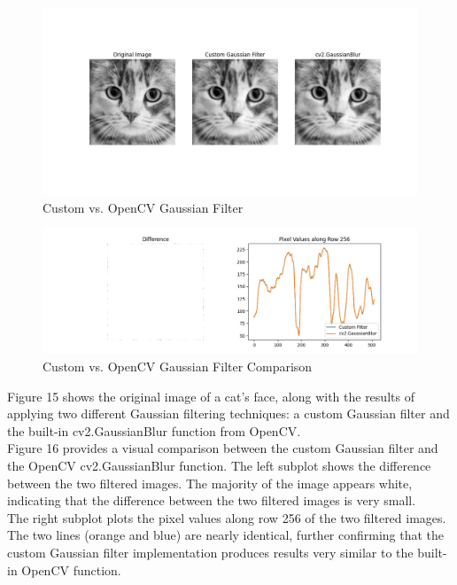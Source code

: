 \documentclass[12pt]{article}
\begin{document}
\begin{figure}
  \centering
  \includegraphics[width=1.0\textwidth]{custom_vs_opencv_gaussian_filter.png}
  \caption{Custom vs. OpenCV Gaussian Filter}
  \label{fig:example}
\end{figure}

\begin{figure}
  \centering
  \includegraphics[width=1.0\textwidth]{custom_vs_opencv_gaussian_filter_comparison.png}
  \caption{Custom vs. OpenCV Gaussian Filter Comparison}
  \label{fig:example}
\end{figure}

Figure 15 shows the original image of a cat's face, along with the results of applying two different Gaussian filtering techniques: a custom Gaussian filter and the built-in cv2.GaussianBlur function from OpenCV.\\

Figure 16 provides a visual comparison between the custom Gaussian filter and the OpenCV cv2.GaussianBlur function. The left subplot shows the difference between the two filtered images. The majority of the image appears white, indicating that the difference between the two filtered images is very small.\\

The right subplot plots the pixel values along row 256 of the two filtered images. The two lines (orange and blue) are nearly identical, further confirming that the custom Gaussian filter implementation produces results very similar to the built-in OpenCV function.\\
\end{document}

